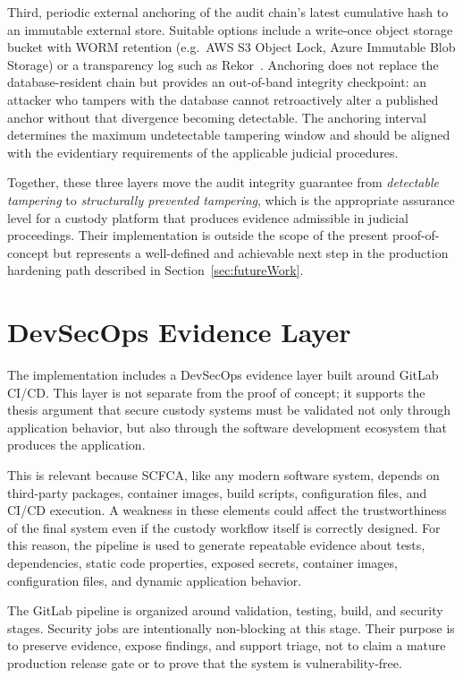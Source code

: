 \documentclass[12pt,a4paper]{report}
\begin{document}
Third, periodic external anchoring of the audit chain's latest cumulative hash to an
immutable external store. Suitable options include a write-once object storage bucket
with WORM retention (e.g.\ AWS S3 Object Lock, Azure Immutable Blob Storage) or a
transparency log such as Rekor~\cite{rekor}. Anchoring does not replace the
database-resident chain but provides an out-of-band integrity checkpoint: an attacker
who tampers with the database cannot retroactively alter a published anchor without
that divergence becoming detectable. The anchoring interval determines the maximum
undetectable tampering window and should be aligned with the evidentiary requirements
of the applicable judicial procedures.

Together, these three layers move the audit integrity guarantee from
\emph{detectable tampering} to \emph{structurally prevented tampering}, which is the
appropriate assurance level for a custody platform that produces evidence admissible in
judicial proceedings. Their implementation is outside the scope of the present
proof-of-concept but represents a well-defined and achievable next step in the
production hardening path described in Section~\ref{sec:futureWork}.




\section{DevSecOps Evidence Layer}

The implementation includes a DevSecOps evidence layer built around GitLab CI/CD. This layer is not separate from the proof of concept; it supports the thesis argument that secure custody systems must be validated not only through application behavior, but also through the software development ecosystem that produces the application.

This is relevant because SCFCA, like any modern software system, depends on third-party packages, container images, build scripts, configuration files, and CI/CD execution. A weakness in these elements could affect the trustworthiness of the final system even if the custody workflow itself is correctly designed. For this reason, the pipeline is used to generate repeatable evidence about tests, dependencies, static code properties, exposed secrets, container images, configuration files, and dynamic application behavior.

The GitLab pipeline is organized around validation, testing, build, and security stages. Security jobs are intentionally non-blocking at this stage. Their purpose is to preserve evidence, expose findings, and support triage, not to claim a mature production release gate or to prove that the system is vulnerability-free.
\end{document}
